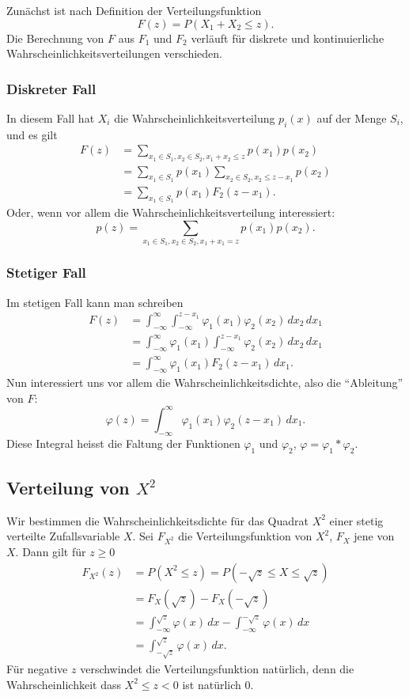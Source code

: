 Zunächst ist nach Definition der Verteilungsfunktion
\[
F(z)=P(X_1+X_2\le z).
\]
Die Berechnung von $F$ aus $F_1$ und $F_2$ verläuft für diskrete und
kontinuierliche Wahrscheinlichkeitsverteilungen verschieden.
\subsubsection{Diskreter Fall}
In diesem Fall hat $X_i$ die Wahrscheinlichkeitsverteilung
$p_i(x)$ auf der Menge $S_i$, und es gilt
\begin{align*}
F(z)&=\sum_{x_1\in S_1, x_2\in S_2, x_1+x_2\le z}p(x_1)p(x_2)\\
&=\sum_{x_1\in S_1}p(x_1)\sum_{x_2\in S_2, x_2 \le z - x_1}p(x_2)\\
&=\sum_{x_1\in S_1}p(x_1) F_2(z-x_1).
\end{align*}
Oder, wenn vor allem die Wahrscheinlichkeitsverteilung interessiert:
\[
p(z)=\sum_{x_1\in S_1, x_2\in S_2, x_1+x_1=z}p(x_1)p(x_2).
\]
\subsubsection{Stetiger Fall}
Im stetigen Fall kann man schreiben
\begin{align*}
F(z)&=\int_{-\infty}^{\infty}\int_{-\infty}^{z-x_1}\varphi_1(x_1)\varphi_2(x_2)
\,dx_2\,dx_1\\
&=\int_{-\infty}^{\infty}
\varphi_1(x_1)
\int_{-\infty}^{z-x_1}
\varphi_2(x_2)
\,dx_2\,dx_1\\
&=\int_{-\infty}^{\infty}
\varphi_1(x_1)
F_2(z-x_1)
\,dx_1.
\end{align*}
Nun interessiert uns vor allem die Wahrscheinlichkeitsdichte, also die
``Ableitung'' von $F$:
\[
\varphi(z)=\int_{-\infty}^{\infty}\varphi_1(x_1)\varphi_2(z-x_1)\,dx_1.
\]
Diese Integral heisst die Faltung der Funktionen $\varphi_1$ und $\varphi_2$,
$\varphi=\varphi_1*\varphi_2$.

\subsection{Verteilung von \texorpdfstring{$X^2$}{X hoch 2}}
Wir bestimmen die Wahrscheinlichkeitsdichte für das Quadrat 
$X^2$ einer stetig verteilte Zufallsvariable $X$.
Sei $F_{X^2}$ die Verteilungsfunktion von $X^2$, $F_X$ jene von $X$.
Dann gilt für $z\ge 0$
\begin{align*}
F_{X^2}(z)&=P(X^2\le z)=P(-\sqrt{z}\le X\le \sqrt{z})\\
&=F_X(\sqrt{z})-F_X(-\sqrt{z})\\
&=\int_{-\infty}^{\sqrt{z}}\varphi(x)\,dx-\int_{-\infty}^{-\sqrt{z}}\varphi(x)\,dx\\
&=\int_{-\sqrt{z}}^{\sqrt{z}}\varphi(x)\,dx.
\end{align*}
Für negative $z$ verschwindet die Verteilungsfunktion natürlich, denn
die Wahrscheinlichkeit dass $X^2\le z <0$ ist natürlich 0.

